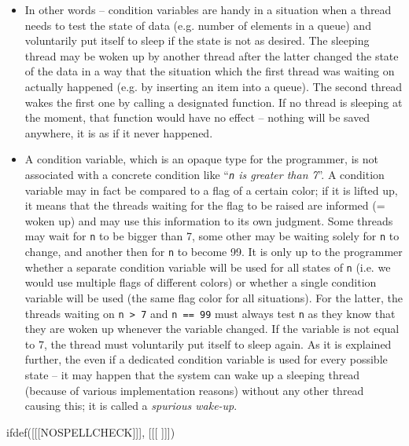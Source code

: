 \begin{itemize}
\item In other words -- condition variables are handy in a situation when a
thread needs to test the state of  data (e.g. number of elements in
a queue) and voluntarily put itself to sleep if the state is not as desired.
The sleeping thread may be woken up by another thread after the latter
changed the state of the data in a way that the situation which the first thread
was waiting on actually happened (e.g. by inserting an item into a queue).  The
second thread wakes the first one by calling a designated function.  If no
thread is sleeping at the moment, that function would have no effect -- nothing
will be saved anywhere, it is as if it never happened.
\item A condition variable, which is an opaque type for the programmer, is not
associated with a concrete condition like ``\emph{\texttt{n} is greater than
7}''.  A condition variable may in fact be compared to a flag of a certain
color; if it is lifted up, it means that the threads waiting for the flag to be
raised are informed (= woken up) and may use this information to its own
judgment.  Some threads may wait for \texttt{n} to be bigger than 7, some other
may be waiting solely for \texttt{n} to change, and another then for \texttt{n}
to become 99.  It is only up to the programmer whether a separate condition
variable will be used for all states of \texttt{n} (i.e. we would use multiple
flags of different colors) or whether a single condition variable will be used
(the same flag color for all situations).  For the latter, the threads waiting
on \texttt{n > 7} and \texttt{n == 99} must always test \texttt{n} as they know
that they are woken up whenever the variable changed.  If the variable is not
equal to 7, the thread must voluntarily put itself to sleep again.  As it is
explained further, the  even if a dedicated condition variable is used for every possible
state -- it may happen that the system can wake up a sleeping thread (because
of various implementation reasons) without any other thread causing this; it is
called a \emph{spurious wake-up}.
\end{itemize}


ifdef([[[NOSPELLCHECK]]], [[[
]]])

